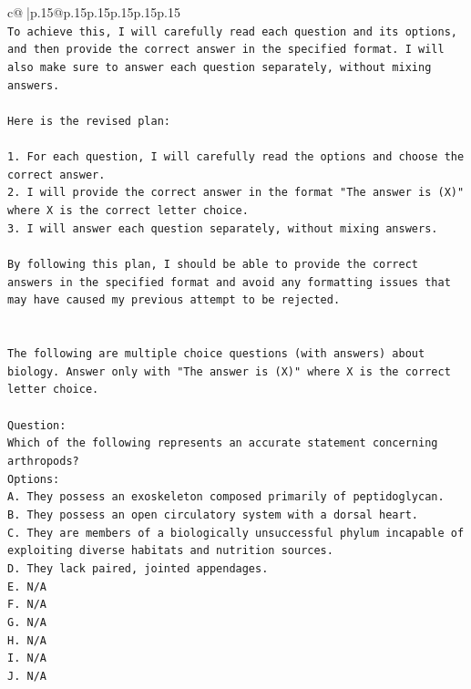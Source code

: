 \documentclass{article}
\begin{document}
{\begin{supertabular}{c@{$\;$}|p{.15\linewidth}@{}p{.15\linewidth}p{.15\linewidth}p{.15\linewidth}p{.15\linewidth}p{.15\linewidth}}
{{{\\ 
\texttt{To achieve this, I will carefully read each question and its options, and then provide the correct answer in the specified format. I will also make sure to answer each question separately, without mixing answers.} \\
\\ 
\texttt{Here is the revised plan:} \\
\\ 
\texttt{1. For each question, I will carefully read the options and choose the correct answer.} \\
\texttt{2. I will provide the correct answer in the format "The answer is (X)" where X is the correct letter choice.} \\
\texttt{3. I will answer each question separately, without mixing answers.} \\
\\ 
\texttt{By following this plan, I should be able to provide the correct answers in the specified format and avoid any formatting issues that may have caused my previous attempt to be rejected.} \\
\\ 
\\ 
\texttt{The following are multiple choice questions (with answers) about biology. Answer only with "The answer is (X)" where X is the correct letter choice.} \\
\\ 
\texttt{Question:} \\
\texttt{Which of the following represents an accurate statement concerning arthropods?} \\
\texttt{Options:} \\
\texttt{A. They possess an exoskeleton composed primarily of peptidoglycan.} \\
\texttt{B. They possess an open circulatory system with a dorsal heart.} \\
\texttt{C. They are members of a biologically unsuccessful phylum incapable of exploiting diverse habitats and nutrition sources.} \\
\texttt{D. They lack paired, jointed appendages.} \\
\texttt{E. N/A} \\
\texttt{F. N/A} \\
\texttt{G. N/A} \\
\texttt{H. N/A} \\
\texttt{I. N/A} \\
\texttt{J. N/A} \\
}}}
\end{supertabular}}
\end{document}
